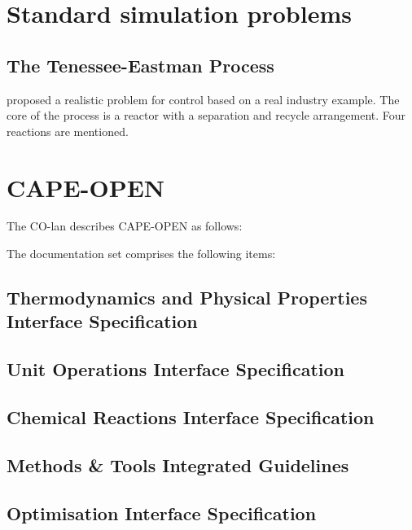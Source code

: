 \section{Standard simulation problems}

\subsection{The Tenessee-Eastman Process}
\label{sec:tenessee-eastman}
\citet{tenesseeeastman} proposed a realistic problem for control based
on a real industry example.  The core of the process is a reactor with
a separation and recycle arrangement.  Four reactions are mentioned.


\section{CAPE-OPEN}
The CO-lan describes CAPE-OPEN as follows:

The documentation set comprises the following items:
\subsection{Thermodynamics and Physical Properties Interface Specification}

\subsection{Unit Operations Interface Specification}

\subsection{Chemical Reactions Interface Specification}

\subsection{Methods \& Tools Integrated Guidelines}

\subsection{Optimisation Interface Specification}


